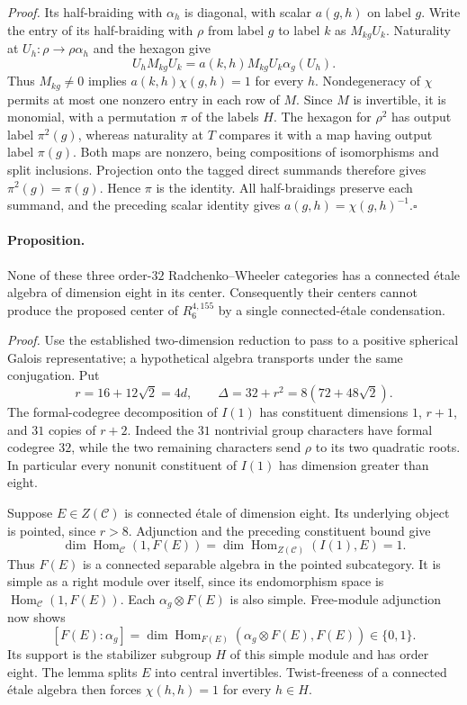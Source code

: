 \emph{Proof.}
Its half-braiding with $\alpha_h$ is diagonal, with scalar $a(g,h)$ on
label $g$. Write the entry of its half-braiding with $\rho$ from label
$g$ to label $k$ as $M_{kg}U_k$. Naturality at
$U_h:\rho\to\rho\alpha_h$ and the hexagon give
\[
 U_hM_{kg}U_k=a(k,h)M_{kg}U_k\alpha_g(U_h).
\]
Thus $M_{kg}\ne0$ implies $a(k,h)\chi(g,h)=1$ for every $h$.
Nondegeneracy of $\chi$ permits at most one nonzero entry in each row
of $M$. Since $M$ is invertible, it is monomial, with a permutation
$\pi$ of the labels $H$. The hexagon for $\rho^2$ has output label
$\pi^2(g)$, whereas naturality at $T$ compares it with a map having
output label $\pi(g)$. Both maps are nonzero, being compositions of
isomorphisms and split inclusions. Projection onto the tagged direct
summands therefore gives $\pi^2(g)=\pi(g)$. Hence $\pi$ is the identity.
All half-braidings preserve each summand, and the preceding scalar
identity gives $a(g,h)=\chi(g,h)^{-1}$.\hfill$\square$

\paragraph{Proposition.}
None of these three order-$32$ Radchenko--Wheeler categories has a
connected \'etale algebra of dimension eight in its center. Consequently
their centers cannot produce the proposed center of $R_6^{4,155}$ by a
single connected-\'etale condensation.

\emph{Proof.}
Use the established two-dimension reduction to pass to a positive
spherical Galois representative; a hypothetical algebra transports under
the same conjugation. Put
\[
 r=16+12\sqrt2=4d,\qquad
 \Delta=32+r^2=8(72+48\sqrt2).
\]
The formal-codegree decomposition of $I(1)$ has constituent dimensions
$1$, $r+1$, and $31$ copies of $r+2$. Indeed the $31$ nontrivial group
characters have formal codegree $32$, while the two remaining characters
send $\rho$ to its two quadratic roots. In particular every nonunit
constituent of $I(1)$ has dimension greater than eight.

Suppose $E\in Z(\mathcal C)$ is connected \'etale of dimension eight.
Its underlying object is pointed, since $r>8$. Adjunction and the
preceding constituent bound give
\[
 \dim\operatorname{Hom}_{\mathcal C}(1,F(E))
 =\dim\operatorname{Hom}_{Z(\mathcal C)}(I(1),E)=1.
\]
Thus $F(E)$ is a connected separable algebra in the pointed subcategory.
It is simple as a right module over itself, since its endomorphism space
is $\operatorname{Hom}_{\mathcal C}(1,F(E))$. Each $\alpha_g\otimes F(E)$
is also simple. Free-module adjunction now shows
\[
 [F(E):\alpha_g]
 =\dim\operatorname{Hom}_{F(E)}(\alpha_g\otimes F(E),F(E))\in\{0,1\}.
\]
Its support is the stabilizer subgroup $H$ of this simple module and has
order eight. The lemma splits $E$ into central invertibles. Twist-freeness
of a connected \'etale algebra then forces $\chi(h,h)=1$ for every
$h\in H$.

